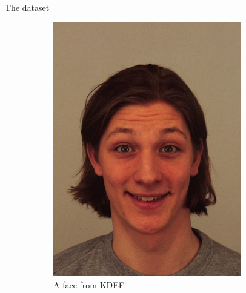 \documentclass[10pt]{beamer}
\begin{document}
\begin{frame}[fragile]{The dataset}
 \begin{figure}[h!]
        \centering
        \begin{subfigure}[c]{0.45\textwidth}
            \centering
            \includegraphics[width=0.9\textwidth]{exercise_3/paper/images/AM18HAS.JPG}
            \caption{A face from KDEF}
            \label{fig:KDEF_face}
        \end{subfigure}
        \begin{subfigure}[c]{0.45\textwidth}
            \centering

\end{subfigure}
\end{figure}
\end{frame}
\end{document}

